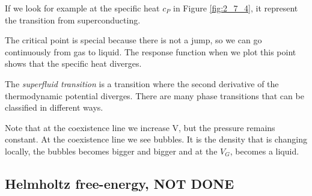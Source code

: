 \documentclass[../../Main/Main.tex]{subfiles}
\begin{document}
If we look for example at the specific heat \( c_P \) in Figure \ref{fig:2_7_4}, it represent the transition from superconducting.

The critical point is special because there is not a jump, so we can go continuously from gas to liquid. The response function when we plot this point shows that the specific heat diverges.

 The \emph{superfluid transition} is a transition where the second derivative of the thermodynamic potential diverges. There are many phase transitions that can be classified in different ways.

 \begin{remark}
Note that at the coexistence line we increase V, but the pressure remains constant. At the coexistence line we see bubbles. It is the density that is changing locally, the bubbles becomes bigger and bigger and at the \( V_G \), becomes a liquid.
 \end{remark}



\subsection{Helmholtz free-energy, NOT DONE}
\end{document}
